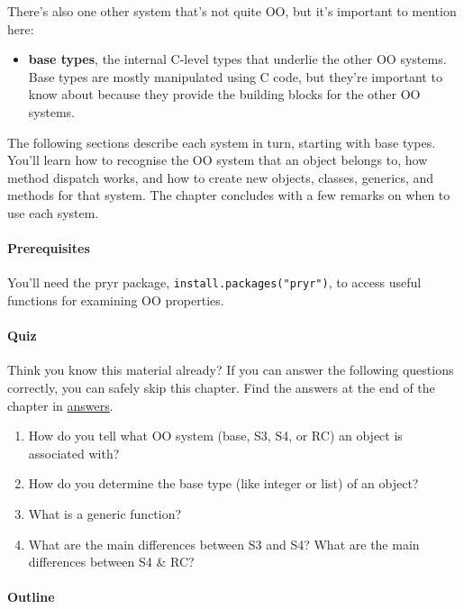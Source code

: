 There's also one other system that's not quite OO, but it's important to
mention here:

\begin{itemize}
\tightlist
\item
  \textbf{base types}, the internal C-level types that underlie the
  other OO systems. Base types are mostly manipulated using C code, but
  they're important to know about because they provide the building
  blocks for the other OO systems.
\end{itemize}

The following sections describe each system in turn, starting with base
types. You'll learn how to recognise the OO system that an object
belongs to, how method dispatch works, and how to create new objects,
classes, generics, and methods for that system. The chapter concludes
with a few remarks on when to use each system.

\hypertarget{prerequisites}{%
\paragraph{Prerequisites}\label{prerequisites}}

You'll need the pryr package, \texttt{install.packages("pryr")}, to
access useful functions for examining OO properties.

\hypertarget{quiz}{%
\paragraph{Quiz}\label{quiz}}

Think you know this material already? If you can answer the following
questions correctly, you can safely skip this chapter. Find the answers
at the end of the chapter in \protect\hyperlink{oo-answers}{answers}.

\begin{enumerate}
\def\labelenumi{\arabic{enumi}.}
\item
  How do you tell what OO system (base, S3, S4, or RC) an object is
  associated with?
\item
  How do you determine the base type (like integer or list) of an
  object?
\item
  What is a generic function?
\item
  What are the main differences between S3 and S4? What are the main
  differences between S4 \& RC?
\end{enumerate}

\hypertarget{outline}{%
\paragraph{Outline}\label{outline}}

